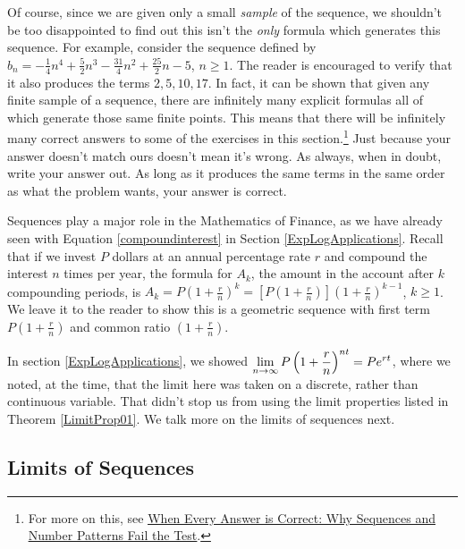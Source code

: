 \documentclass{ximera}
\begin{document}
Of course, since we are given only a small \textit{sample} of the sequence, we shouldn't be too disappointed to find out this isn't the \textit{only} formula which generates this sequence.  For example, consider the sequence defined by $b_{n} = -\frac{1}{4} n^4 + \frac{5}{2} n^3 - \frac{31}{4} n^2 + \frac{25}{2} n - 5$, $n \geq 1$.  The reader is encouraged to verify that it also produces the  terms  $2, 5, 10, 17$.  In fact, it can be shown that given any finite sample of a sequence, there are infinitely many explicit formulas all of which generate those same finite points.  This means that there will be infinitely many correct answers to some of the exercises in this section.\footnote{For more on this, see \href{http://www.math.kent.edu/~white/papers/pattern.pdf}{\underline{When Every Answer is Correct: Why
Sequences and Number Patterns Fail the Test}}.}  Just because your answer doesn't match ours doesn't mean it's wrong.  As always, when in doubt, write your answer out.  As long as it produces the same terms in the same order as what the problem wants, your answer is correct.  

\smallskip

Sequences play a major role in the Mathematics of Finance, as we have already seen with Equation \ref{compoundinterest} in Section \ref{ExpLogApplications}.  Recall that if we invest $P$ dollars at an annual percentage rate $r$ and compound the interest $n$ times per year,  the formula for $A_{k}$, the amount in the account after $k$ compounding periods, is $A_{k} = P\left(1 + \frac{r}{n}\right)^{k} = \left[P\left(1 + \frac{r}{n}\right)\right]\left(1 + \frac{r}{n}\right)^{k-1}$, $ k \geq 1$.  We leave it to the reader to show this is a geometric sequence with first term $P\left(1 + \frac{r}{n}\right)$ and common ratio $\left(1 + \frac{r}{n}\right)$. 

\medskip

 In section \ref{ExpLogApplications}, we showed $\ds{\lim_{n \rightarrow \infty} P\left(1 + \frac{r}{n}\right)^{nt} = Pe^{rt}}$, where we noted, at the time, that the limit here was taken on a discrete, rather than continuous variable.  That didn't stop us from using the limit properties listed in Theorem \ref{LimitProp01}.  We talk more on the limits of sequences next.


\subsection{Limits of Sequences}
\label{sequencelimits}
\end{document}
